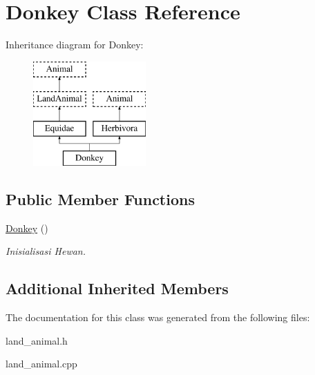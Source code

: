 \hypertarget{class_donkey}{}\section{Donkey Class Reference}
\label{class_donkey}
Inheritance diagram for Donkey\+:\begin{figure}[H]
\begin{center}
\leavevmode
\includegraphics[height=4.000000cm]{class_donkey}
\end{center}
\end{figure}
\subsection*{Public Member Functions}
\begin{DoxyCompactItemize}
\item 
\hyperlink{class_donkey_a46636e4338c82695d96b1baff4aeea4c}{Donkey} ()\hypertarget{class_donkey_a46636e4338c82695d96b1baff4aeea4c}{}\label{class_donkey_a46636e4338c82695d96b1baff4aeea4c}

\begin{DoxyCompactList}\small\item\em Inisialisasi Hewan. \end{DoxyCompactList}\end{DoxyCompactItemize}
\subsection*{Additional Inherited Members}


The documentation for this class was generated from the following files\+:\begin{DoxyCompactItemize}
\item 
land\+\_\+animal.\+h\item 
land\+\_\+animal.\+cpp\end{DoxyCompactItemize}
